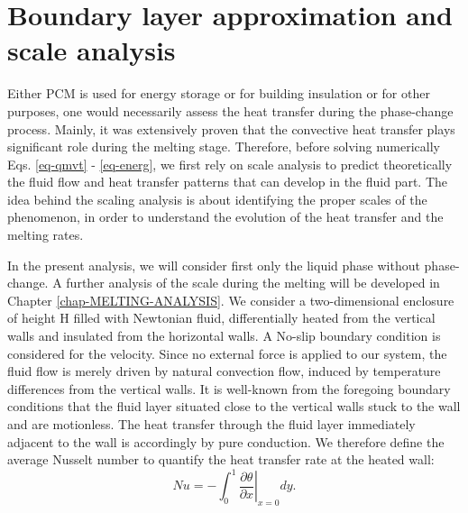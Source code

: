 \section{Boundary layer approximation and scale analysis} \label{sec-bound-scal-anal}
Either PCM is used for energy storage or for building insulation or for other purposes, one would necessarily assess the heat transfer during the phase-change process.
Mainly, it was extensively proven that the convective heat transfer plays significant role during the melting stage.
Therefore, before solving numerically Eqs. \ref{eq-qmvt} - \ref{eq-energ}, we first rely on scale analysis to predict theoretically the fluid flow and heat transfer patterns that can develop in the fluid part.
The idea behind the scaling analysis is about identifying the proper scales of the phenomenon, in order to understand the evolution of the heat transfer and the melting rates.

In the present analysis, we will consider first only the liquid phase without phase-change.
A further analysis of the scale during the melting will be developed in Chapter \ref{chap-MELTING-ANALYSIS}.
We consider a two-dimensional enclosure of height H filled with Newtonian fluid, differentially heated from the vertical walls and insulated from the horizontal walls.
A No-slip boundary condition is considered for the velocity. 
Since no external force is applied to our system, the fluid flow is merely driven by natural convection flow, induced by temperature differences from the vertical walls.
It is well-known from the foregoing boundary conditions that the fluid layer situated close to the vertical walls stuck to the wall and are motionless.
The heat transfer through the fluid layer immediately adjacent to the wall is accordingly by pure conduction.
We therefore define the average Nusselt number to quantify the heat transfer rate at the heated wall:
\begin{equation}\label{eq-def-Nu}
   N\!u = - \int_0^1 \left. \frac{\partial \theta}{\partial x} \right |_{x=0} dy.
\end{equation}

